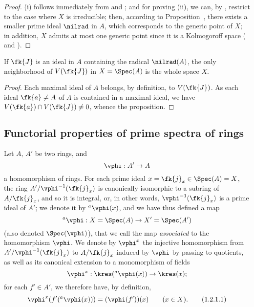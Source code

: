 \begin{proof}
\label{proof-1.1.1.14}
(i) follows immediately from  and ;
and for proving (ii), we can, by , restrict to the case where $X$ is irreducible;
then, according to Proposition~, there exists a smaller prime ideal $\nilrad$ in $A$, which corresponds to the generic point
of $X$;
in addition, $X$ admits at most one generic point since it is a Kolmogoroff space ( and ).
\end{proof}

\begin{prop}[1.1.15]
\label{1.1.1.15}
If $\fk{J}$ is an ideal in $A$ containing the radical $\nilrad(A)$, the only
neighborhood of $V(\fk{J})$ in $X=\Spec(A)$ is the whole space $X$.
\end{prop}

\begin{proof}
\label{proof-1.1.1.15}
Each maximal ideal of $A$ belongs, by definition, to $V(\fk{J})$.
As each ideal $\fk{a}\neq A$ of $A$ is contained in a maximal ideal, we have $V(\fk{a})\cap V(\fk{J})\neq 0$, whence the proposition.
\end{proof}

\subsection{Functorial properties of prime spectra of rings}
\label{subsection:func-prop}

\begin{env}[1.2.1]
\label{1.1.2.1}
Let $A$, $A'$ be two rings, and
\[
  \vphi:A'\to A
\]
a homomorphism of rings.
For each prime ideal $x=\fk{j}_x\in\Spec(A)=X$, the ring $A'/\vphi^{-1}(\fk{j}_x)$ is canonically isomorphic to a subring of $A/\fk{j}_x$, and so it is integral, or, in other words, $\vphi^{-1}(\fk{j}_x)$ is a prime ideal of $A'$;
we denote it by ${}^a\vphi(x)$, and we have thus defined a map
\[
  {}^a\vphi:X=\Spec(A)\to X'=\Spec(A')
\]
(also denoted $\Spec(\vphi)$), that we call the map \emph{associated} to the homomorphism $\vphi$.
We denote by $\vphi^x$ the injective homomorphism from $A'/\vphi^{-1}(\fk{j}_x)$ to $A/\fk{j}_x$ induced by $\vphi$ by passing to quotients, as well as its canonical extension to a monomorphism of fields
\[
  \vphi^x:\kres({}^a\vphi(x))\to\kres(x);
\]
for each $f'\in A'$, we therefore have, by definition,
\[
  \vphi^x(f'({}^a\vphi(x)))=(\vphi(f'))(x)\qquad(x\in X).
  \tag{1.2.1.1}
\]
\end{env}

